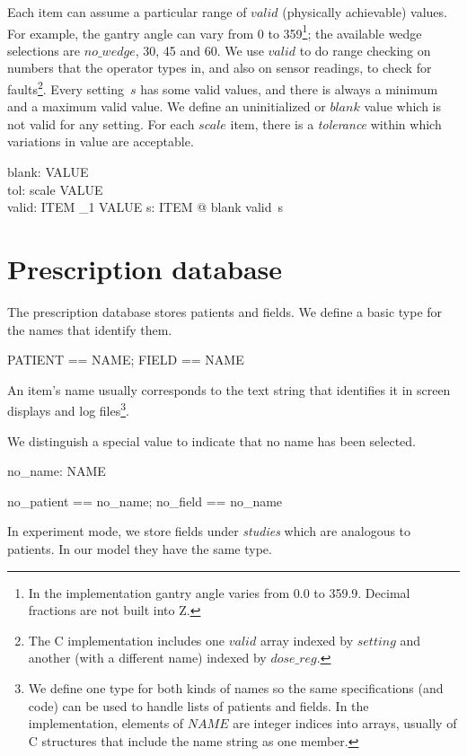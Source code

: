 \documentclass{article}
\begin{document}
Each item can assume a particular range of $valid$ (physically
achievable) values.  For example, the gantry angle can vary from 0 to
359\footnote{In the implementation gantry angle varies from 0.0 to
359.9. Decimal fractions are not built into Z.}; the available wedge
selections are $no\_wedge$, 30, 45 and 60.  We use $valid$ to do range
checking on numbers that the operator types in, and also on
sensor readings, to check for faults\footnote{The
C implementation includes one $valid$ array indexed by $setting$ and
another (with a different name) indexed by $dose\_reg$.}.  Every
setting~$s$ has some valid values, and there is always a minimum and a
maximum valid value. We define
an uninitialized or $blank$ value which is not valid for any setting.
For each $scale$ item, there is a {\em tolerance} within which
variations in value are acceptable.

\begin{axdef}
	blank: VALUE \\
        tol: scale \fun VALUE \\
	valid: ITEM \fun \finset_1 VALUE
\where
	\forall s: ITEM @ blank \notin valid~s \\
\end{axdef}

\section{Prescription database} \label{sect:prescr}

The prescription database stores patients and fields.  We define a
basic type for the names that identify them.

\begin{zed}
	[NAME]
\also
	PATIENT == NAME; FIELD == NAME
\end{zed}
An item's name usually corresponds to the text string that identifies
it in screen displays and log files\footnote{We define one type for
both kinds of names so the same specifications (and code) can be used
to handle lists of patients and fields.  In the implementation,
elements of $NAME$ are integer indices into arrays, usually of C
structures that include the name string as one member.}.

We distinguish a special value to indicate that no name has been
selected.

\begin{axdef}
	no\_name: NAME \\
\end{axdef}
\begin{zed} no\_patient == no\_name; no\_field == no\_name \end{zed}
In experiment mode, we store fields under {\em studies} which are
analogous to patients.  In our model they have the same type.
\end{document}
